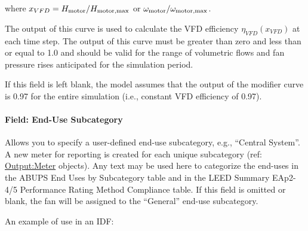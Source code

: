 where \(x_{VFD} = H_{\rm{motor}} / H_{\rm{motor, max}}\) or \(\omega_{\rm{motor}} / \omega_{\rm{motor, max}}\).

The output of this curve is used to calculate the VFD efficiency \(\eta_{VFD}(x_{VFD})\) at each time step. The output of this curve must be greater than zero and less than or equal to 1.0 and should be valid for the range of volumetric flows and fan pressure rises anticipated for the simulation period.

If this field is left blank, the model assumes that the output of the modifier curve is 0.97 for the entire simulation (i.e., constant VFD efficiency of 0.97).

\paragraph{Field: End-Use Subcategory}\label{field-end-use-subcategory-4}

Allows you to specify a user-defined end-use subcategory, e.g., ``Central System''. A new meter for reporting is created for each unique subcategory (ref: \hyperref[outputmeter-and-outputmetermeterfileonly]{Output:Meter} objects). Any text may be used here to categorize the end-uses in the ABUPS End Uses by Subcategory table and in the LEED Summary EAp2-4/5 Performance Rating Method Compliance table. If this field is omitted or blank, the fan will be assigned to the ``General'' end-use subcategory.

An example of use in an IDF:

